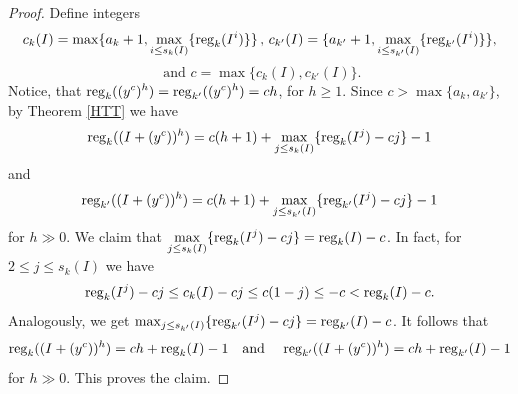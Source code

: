 \documentclass[11pt,oneside]{amsart}
\theoremstyle{plain}
\theoremstyle{definition}
\newcommand{\reg}{{\rm reg}}
\begin{document}
\begin{proof}
Define integers $$c_k(I)=\mathrm{max}\{a_k+1,\max_{i \leq s_k(I)}\{\reg_k(I^i)\}\}\,,\,c_{k'}(I)= \{a_{k'}+1,\max_{i \leq s_{k'}(I)}\{\reg_{k'}(I^i)\}\},$$ $$\text{ and } 
c=\max\{c_k(I),c_{k'}(I)\}.
$$
Notice, that $\displaystyle{\reg_k((y^c)^h)=\reg_{k'}((y^c)^h)=ch}$, for $h \geq 1$. Since $c>\max \{a_k,a_{k'}\}$, by Theorem \ref{HTT} we have
\[
\reg_k((I+(y^c))^h) = c(h+1) + \max_{j \leq s_k(I)}\{\reg_k(I^j)-cj\} - 1
\]
and
\[
\reg_{k'}((I+(y^c))^h) = c(h+1) + \max_{j \leq s_{k'}(I)}\{\reg_{k'}(I^j)-cj\} - 1
\]
for $h \gg 0$. We claim that $\displaystyle{\max_{j \leq s_k(I)}\{\reg_k(I^j)-cj\}=\reg_k(I)-c}$. In fact, for $2 \leq j \leq s_k(I)$ we have
\[
\reg_k(I^j)-cj \leq c_k(I)-cj \leq c(1-j) \leq -c<\reg_k(I)-c.
\]
Analogously, we get $\mathrm{max}_{j \leq s_{k'}(I)}\{\reg_{k'}(I^j)-cj\}=\reg_{k'}(I)-c$. It follows that
\[
\reg_k((I+(y^c))^h)=ch+\reg_k(I)-1 \text{\quad and \quad} \reg_{k'}((I+(y^c))^h)=ch+\reg_{k'}(I)-1
\]
for $h \gg 0$. This proves the claim.
\end{proof}
\end{document}
